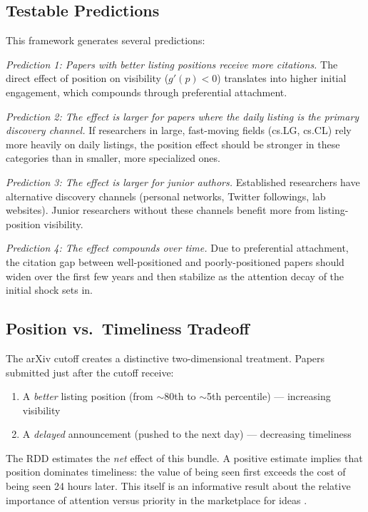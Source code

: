 \documentclass[12pt]{article}
\begin{document}
\subsection{Testable Predictions}

This framework generates several predictions:

\textit{Prediction 1: Papers with better listing positions receive more citations.} The direct effect of position on visibility ($g'(p) < 0$) translates into higher initial engagement, which compounds through preferential attachment.

\textit{Prediction 2: The effect is larger for papers where the daily listing is the primary discovery channel.} If researchers in large, fast-moving fields (cs.LG, cs.CL) rely more heavily on daily listings, the position effect should be stronger in these categories than in smaller, more specialized ones.

\textit{Prediction 3: The effect is larger for junior authors.} Established researchers have alternative discovery channels (personal networks, Twitter followings, lab websites). Junior researchers without these channels benefit more from listing-position visibility.

\textit{Prediction 4: The effect compounds over time.} Due to preferential attachment, the citation gap between well-positioned and poorly-positioned papers should widen over the first few years and then stabilize as the attention decay of the initial shock sets in.

\subsection{Position vs.\ Timeliness Tradeoff}

The arXiv cutoff creates a distinctive two-dimensional treatment. Papers submitted just after the cutoff receive:
\begin{enumerate}
\item A \textit{better} listing position (from $\sim$80th to $\sim$5th percentile) --- increasing visibility
\item A \textit{delayed} announcement (pushed to the next day) --- decreasing timeliness
\end{enumerate}

The RDD estimates the \textit{net} effect of this bundle. A positive estimate implies that position dominates timeliness: the value of being seen first exceeds the cost of being seen 24 hours later. This itself is an informative result about the relative importance of attention versus priority in the marketplace for ideas \citep{strevens2003}.
\end{document}

